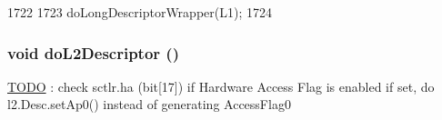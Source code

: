 \begin{DoxyCode}
1722 {
1723     doLongDescriptorWrapper(L1);
1724 }
\end{DoxyCode}
\hypertarget{classArmISA_1_1TableWalker_a45b9877779ac070b7779f7e1eccdd05e}{
\subsubsection[{doL2Descriptor}]{\setlength{\rightskip}{0pt plus 5cm}void doL2Descriptor ()}}
\label{classArmISA_1_1TableWalker_a45b9877779ac070b7779f7e1eccdd05e}


\begin{Desc}
\item[\hyperlink{todo__todo000004}{TODO}]: check sctlr.ha (bit\mbox{[}17\mbox{]}) if Hardware Access Flag is enabled if set, do l2.Desc.setAp0() instead of generating AccessFlag0 \end{Desc}



